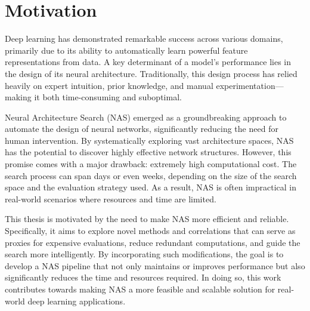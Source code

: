 \section*{Motivation}
Deep learning has demonstrated remarkable success across various domains, primarily due to its ability to automatically learn powerful feature representations from data. A key determinant of a model’s performance lies in the design of its neural architecture. Traditionally, this design process has relied heavily on expert intuition, prior knowledge, and manual experimentation—making it both time-consuming and suboptimal.

Neural Architecture Search (NAS) emerged as a groundbreaking approach to automate the design of neural networks, significantly reducing the need for human intervention. By systematically exploring vast architecture spaces, NAS has the potential to discover highly effective network structures. However, this promise comes with a major drawback: extremely high computational cost. The search process can span days or even weeks, depending on the size of the search space and the evaluation strategy used. As a result, NAS is often impractical in real-world scenarios where resources and time are limited. \cite{Wang_2020_CVPR} 

This thesis is motivated by the need to make NAS more efficient and reliable. Specifically, it aims to explore novel methods and correlations that can serve as proxies for expensive evaluations, reduce redundant computations, and guide the search more intelligently. By incorporating such modifications, the goal is to develop a NAS pipeline that not only maintains or improves performance but also significantly reduces the time and resources required. In doing so, this work contributes towards making NAS a more feasible and scalable solution for real-world deep learning applications.


